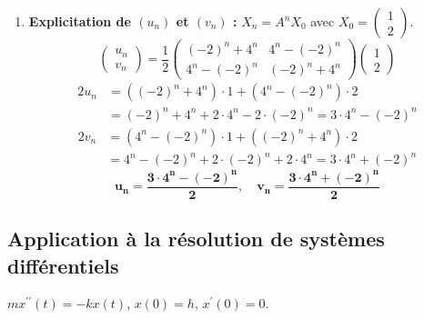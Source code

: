 \documentclass[french]{yLectureNote}
\begin{document}
\begin{enumerate}
    \item \textbf{Explicitation de $(u_{n})$ et $(v_{n})$ :}
    $X_n = A^n X_0$ avec $X_0 = \begin{pmatrix} 1 \\ 2 \end{pmatrix}$.
    $$\begin{pmatrix} u_n \\ v_n \end{pmatrix} = \frac{1}{2} \begin{pmatrix} (-2)^n+4^n & 4^n-(-2)^n \\ 4^n-(-2)^n & (-2)^n+4^n \end{pmatrix} \begin{pmatrix} 1 \\ 2 \end{pmatrix}$$
    \begin{align*}
    2u_n &= ((-2)^n+4^n) \cdot 1 + (4^n-(-2)^n) \cdot 2 \\
         &= (-2)^n + 4^n + 2 \cdot 4^n - 2 \cdot (-2)^n = 3 \cdot 4^n - (-2)^n
    \end{align*}
    \begin{align*}
    2v_n &= (4^n-(-2)^n) \cdot 1 + ((-2)^n+4^n) \cdot 2 \\
         &= 4^n - (-2)^n + 2 \cdot (-2)^n + 2 \cdot 4^n = 3 \cdot 4^n + (-2)^n
    \end{align*}
    $$\mathbf{u_n = \frac{3 \cdot 4^n - (-2)^n}{2}, \quad v_n = \frac{3 \cdot 4^n + (-2)^n}{2}}$$
\end{enumerate}

\subsection{Application à la résolution de systèmes différentiels}
$mx^{\prime\prime}(t)=-kx(t)$, $x(0)=h$, $x^{\prime}(0)=0$.
\end{document}
